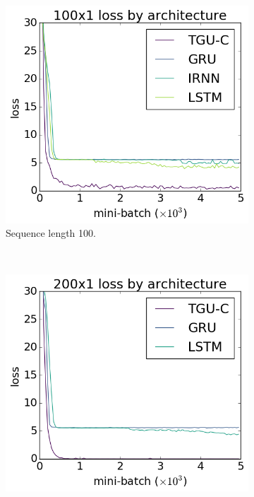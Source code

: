 \begin{figure}[tbh]
\centering
\begin{subfigure}[t]{0.3\linewidth}
	\includegraphics[width=\linewidth]{exps/vbind/plots/100x1}
	\caption{Sequence length 100.}
\end{subfigure}~
\begin{subfigure}[t]{0.3\linewidth}
	\includegraphics[width=\linewidth]{exps/vbind/plots/200x1}

\end{subfigure}
\end{figure}
